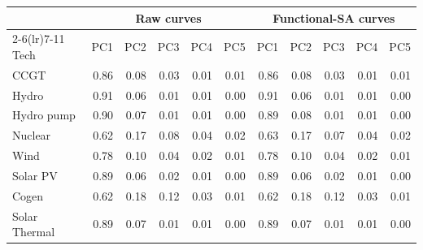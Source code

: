 \begin{tabular}{l r r r r r r r r r r}
\toprule
 & \multicolumn{5}{c}{Raw curves} & \multicolumn{5}{c}{Functional-SA curves} \\
\cmidrule(lr){2-6}\cmidrule(lr){7-11}
Tech & PC1 & PC2 & PC3 & PC4 & PC5 & PC1 & PC2 & PC3 & PC4 & PC5 \\
\midrule
CCGT & 0.86 & 0.08 & 0.03 & 0.01 & 0.01 & 0.86 & 0.08 & 0.03 & 0.01 & 0.01 \\
Hydro & 0.91 & 0.06 & 0.01 & 0.01 & 0.00 & 0.91 & 0.06 & 0.01 & 0.01 & 0.00 \\
Hydro pump & 0.90 & 0.07 & 0.01 & 0.01 & 0.00 & 0.89 & 0.08 & 0.01 & 0.01 & 0.00 \\
Nuclear & 0.62 & 0.17 & 0.08 & 0.04 & 0.02 & 0.63 & 0.17 & 0.07 & 0.04 & 0.02 \\
Wind & 0.78 & 0.10 & 0.04 & 0.02 & 0.01 & 0.78 & 0.10 & 0.04 & 0.02 & 0.01 \\
Solar PV & 0.89 & 0.06 & 0.02 & 0.01 & 0.00 & 0.89 & 0.06 & 0.02 & 0.01 & 0.00 \\
Cogen & 0.62 & 0.18 & 0.12 & 0.03 & 0.01 & 0.62 & 0.18 & 0.12 & 0.03 & 0.01 \\
Solar Thermal & 0.89 & 0.07 & 0.01 & 0.01 & 0.00 & 0.89 & 0.07 & 0.01 & 0.01 & 0.00 \\
\bottomrule
\end{tabular}